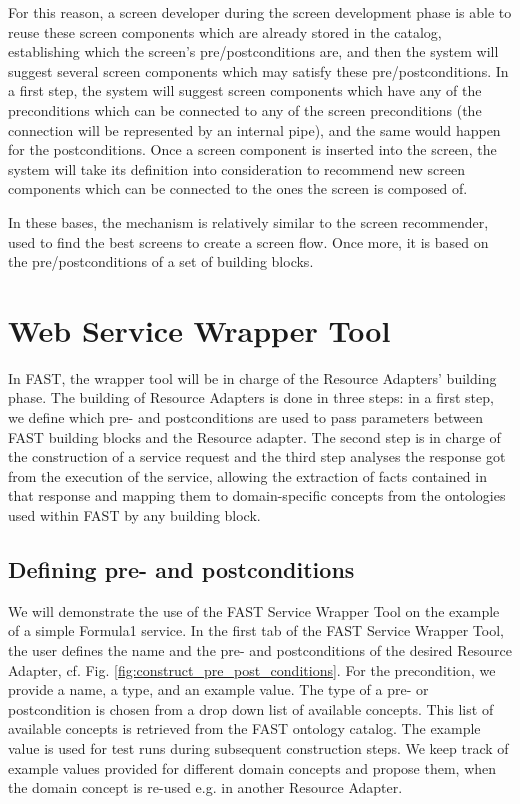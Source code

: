 \documentclass{article}
\begin{document}
For this reason, a screen developer during the screen development phase is able to reuse these screen components which are already stored in the catalog, establishing which the screen's pre/postconditions are, and then the system will suggest several screen components which may satisfy these pre/postconditions. In a first step, the system will suggest screen components which have any of the preconditions which can be connected to any of the screen preconditions (the connection will be represented by an internal pipe), and the same would happen for the postconditions. Once a screen component is inserted into the screen, the system will take its definition into consideration to recommend new screen components which can be connected to the ones the screen is composed of.

In these bases, the mechanism is relatively similar to the screen recommender, used to find the best screens to create a screen flow. Once more, it is based on the pre/postconditions of a set of building blocks.





\clearpage
\section{Web Service Wrapper Tool} %
\label{sec:restful_web_services_wrapper_tool}

In FAST, the wrapper tool will be in charge of the Resource Adapters' building phase. The building of Resource Adapters is done in three steps: in a first step, we define which pre- and postconditions are used to pass parameters between FAST building blocks and the Resource adapter. The second step is in charge of the construction of a service request and the third step analyses the response got from the execution of the service, allowing the extraction of facts contained in that response and mapping them to domain-specific concepts from the ontologies used within FAST by any building block.


\subsection{Defining pre- and postconditions} %
\label{sub:resource_adapter_parameters}

We will demonstrate the use of the FAST Service Wrapper Tool on the example of a simple Formula1 service. In the first tab of the FAST Service Wrapper Tool, the user defines the name and the pre- and postconditions of the desired Resource Adapter, cf. Fig. \ref{fig:construct_pre_post_conditions}. For the precondition, we provide a name, a type, and an example value. The type of a pre- or postcondition is chosen from a drop down list of available concepts. This list of available concepts is retrieved from the FAST ontology catalog. The example value is used for test runs during subsequent construction steps. We keep track of example values provided for different domain concepts and propose them, when the domain concept is re-used e.g. in another Resource Adapter. 
\end{document}
